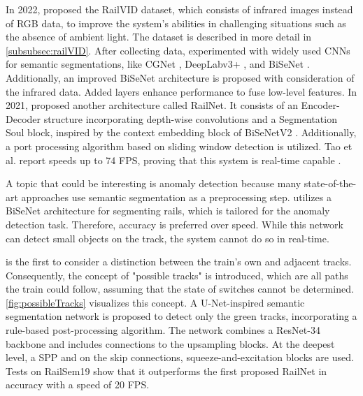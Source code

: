 In 2022, \cite{yuan2022railvid} proposed the RailVID dataset, which consists of infrared images instead of \ac{RGB} data, to improve the system's abilities in challenging situations such as the absence of ambient light.
The dataset is described in more detail in \autoref{subsubsec:railVID}.
After collecting data, \cite{yuan2022railvid} experimented with widely used \ac{CNN}s for semantic segmentations, like \ac{CGNet} \cite{CGNet}, DeepLabv3+ \cite{DeepLabV3plus2018}, and \ac{BiSeNet} \cite{BiSeNet2019}.
Additionally, an improved BiSeNet architecture is proposed with consideration of the infrared data. Added layers enhance performance to fuse low-level features.
In 2021, \cite{AccurateLightweightRailNet2021} proposed another architecture called RailNet.
It consists of an Encoder-Decoder structure incorporating depth-wise convolutions and a Segmentation Soul block, inspired by the context embedding block of \ac{BiSeNet}V2 \cite{BiSeNetV22021}.
Additionally, a port processing algorithm based on sliding window detection is utilized.
Tao et al. report speeds up to 74 \ac{FPS}, proving that this system is real-time capable \cite{AccurateLightweightRailNet2021}.

A topic that could be interesting is anomaly detection because many state-of-the-art approaches use semantic segmentation as a preprocessing step.
\cite{anomalyDetection2021} utilizes a \ac{BiSeNet} \cite{BiSeNet2019} architecture for segmenting rails, which is tailored for the anomaly detection task.
Therefore, accuracy is preferred over speed.
While this network can detect small objects on the track, the system cannot do so in real-time.

\cite{RailraodSemanticPossibleTracks2020} is the first to consider a distinction between the train's own and adjacent tracks.
Consequently, the concept of "possible tracks" is introduced, which are all paths the train could follow, assuming that the state of switches cannot be determined.
\autoref{fig:possibleTracks} visualizes this concept.
A U-Net-inspired \cite{uNet2015} semantic segmentation network is proposed to detect only the green tracks, incorporating a rule-based post-processing algorithm.
The network combines a ResNet-34 \cite{ResNet} backbone and includes connections to the upsampling blocks.
At the deepest level, a \ac{SPP} \cite{spatialPyramidPooling2014} and on the skip connections, squeeze-and-excitation blocks \cite{SqueezeAndExcitation2019} are used.
Tests on RailSem19 show that it outperforms the first proposed RailNet \cite{railNet2019} in accuracy with a speed of 20 \ac{FPS}.

